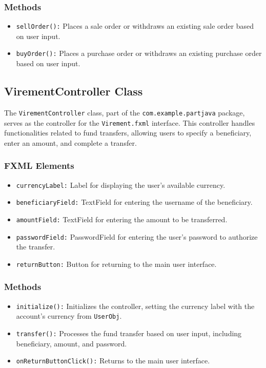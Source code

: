 \documentclass{article}
\begin{document}
\subsubsection*{Methods}

\begin{itemize}
    \item \texttt{sellOrder():} Places a sale order or withdraws an existing sale order based on user input.
    \item \texttt{buyOrder():} Places a purchase order or withdraws an existing purchase order based on user input.
\end{itemize}

\subsection{VirementController Class}

The \texttt{VirementController} class, part of the \texttt{com.example.partjava} package, serves as the controller for the \texttt{Virement.fxml} interface. This controller handles functionalities related to fund transfers, allowing users to specify a beneficiary, enter an amount, and complete a transfer.

\subsubsection{FXML Elements}

\begin{itemize}
    \item \texttt{currencyLabel:} Label for displaying the user's available currency.
    \item \texttt{beneficiaryField:} TextField for entering the username of the beneficiary.
    \item \texttt{amountField:} TextField for entering the amount to be transferred.
    \item \texttt{passwordField:} PasswordField for entering the user's password to authorize the transfer.
    \item \texttt{returnButton:} Button for returning to the main user interface.
\end{itemize}

\subsubsection{Methods}

\begin{itemize}
    \item \texttt{initialize():} Initializes the controller, setting the currency label with the account's currency from \texttt{UserObj}.
    \item \texttt{transfer():} Processes the fund transfer based on user input, including beneficiary, amount, and password.
    \item \texttt{onReturnButtonClick():} Returns to the main user interface.
\end{itemize}
\end{document}
